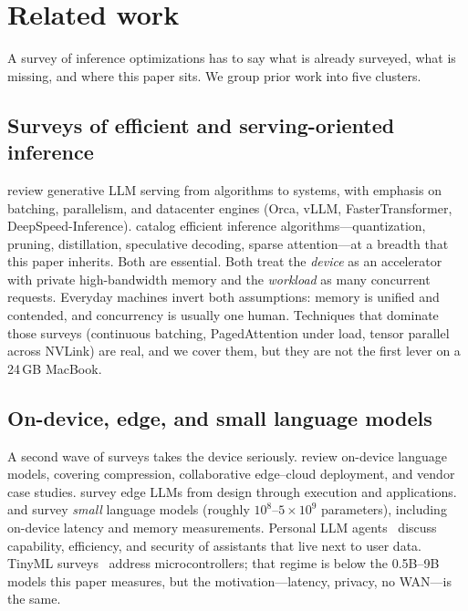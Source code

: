 \section{Related work}
\label{sec:related}

A survey of inference optimizations has to say what is already surveyed, what is missing, and where this paper sits. We group prior work into five clusters.

\subsection{Surveys of efficient and serving-oriented inference}

\citet{miao2023survey} review generative LLM serving from algorithms to systems, with emphasis on batching, parallelism, and datacenter engines (Orca, vLLM, FasterTransformer, DeepSpeed-Inference). \citet{lin2024qwq} catalog efficient inference algorithms---quantization, pruning, distillation, speculative decoding, sparse attention---at a breadth that this paper inherits. Both are essential. Both treat the \emph{device} as an accelerator with private high-bandwidth memory and the \emph{workload} as many concurrent requests. Everyday machines invert both assumptions: memory is unified and contended, and concurrency is usually one human. Techniques that dominate those surveys (continuous batching, PagedAttention under load, tensor parallel across NVLink) are real, and we cover them, but they are not the first lever on a 24\,GB MacBook.

\subsection{On-device, edge, and small language models}

A second wave of surveys takes the device seriously. \citet{xu2024ondevice} review on-device language models, covering compression, collaborative edge--cloud deployment, and vendor case studies. \citet{qu2025edge} survey edge LLMs from design through execution and applications. \citet{lu2024slm} and \citet{van2024surveyslm} survey \emph{small} language models (roughly $10^8$--$5\times 10^9$ parameters), including on-device latency and memory measurements. Personal LLM agents~\citep{chen2024personal} discuss capability, efficiency, and security of assistants that live next to user data. TinyML surveys~\citep{xu2024ondevice} address microcontrollers; that regime is below the 0.5B--9B models this paper measures, but the motivation---latency, privacy, no WAN---is the same.

